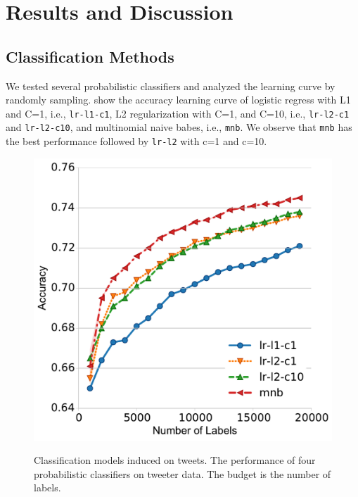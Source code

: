  
\section{Results and Discussion}

\subsection{Classification Methods }
We tested several probabilistic classifiers and analyzed the learning curve by randomly sampling.  show the accuracy learning curve of logistic regress with L1 and C=1, i.e., {\tt{lr-l1-c1}}, L2 regularization with C=1, and C=10, i.e., {\tt{lr-l2-c1}} and {\tt{lr-l2-c10}}, and multinomial naive babes, i.e., {\tt{mnb}}. We observe that {\tt{mnb}} has the best performance followed by {\tt{lr-l2}} with c=1 and c=10. 

\begin{figure}[t]
	\centering
		\centerline{
				\includegraphics[width=0.9\columnwidth]{fig/models-accu.pdf}
			\label{fig:class}	
		}
		\vskip -0.15in
		\caption{Classification models induced on tweets. The performance of four probabilistic classifiers on tweeter data. The budget is the number of labels.}
		\label{fig:user}
	\vskip -0.1in
\end{figure}

